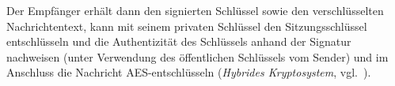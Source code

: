 \noindent
Der Empfänger erhält dann den signierten Schlüssel sowie den verschlüsselten Nachrichtentext, kann mit seinem privaten Schlüssel den Sitzungsschlüssel entschlüsseln und die Authentizität des Schlüssels anhand der Signatur nachweisen (unter Verwendung des öffentlichen Schlüssels vom Sender) und im Anschluss die Nachricht AES-entschlüsseln (\textit{Hybrides Kryptosystem}, vgl.~\cite[95f.]{ITS3}).
